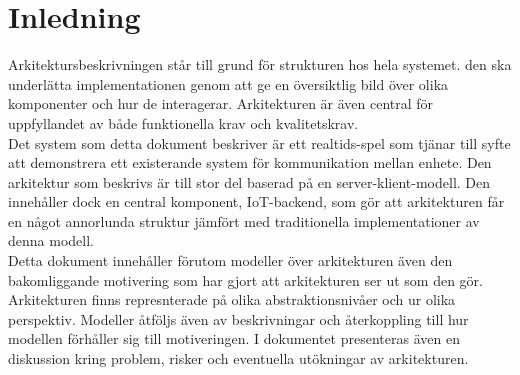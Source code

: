 \section{Inledning}
Arkitektursbeskrivningen står till grund för strukturen hos hela systemet. den ska underlätta implementationen genom att ge en översiktlig bild över olika komponenter och hur de interagerar. Arkitekturen är även central för uppfyllandet av både funktionella krav och kvalitetskrav.\\

Det system som detta dokument beskriver är ett realtids-spel som tjänar till syfte att demonstrera ett existerande system för kommunikation mellan enhete. Den arkitektur som beskrivs är till stor del baserad på en server-klient-modell. Den innehåller dock en central komponent, IoT-backend, som gör att arkitekturen får en något annorlunda struktur jämfört med traditionella implementationer av denna modell.\\

Detta dokument innehåller förutom modeller över arkitekturen även den bakomliggande motivering som har gjort att arkitekturen ser ut som den gör. Arkitekturen finns represnterade på olika abstraktionsnivåer och ur olika perspektiv. Modeller åtföljs även av beskrivningar och återkoppling till hur modellen förhåller sig till motiveringen. I dokumentet presenteras även en diskussion kring problem, risker och eventuella utökningar av arkitekturen.\\
